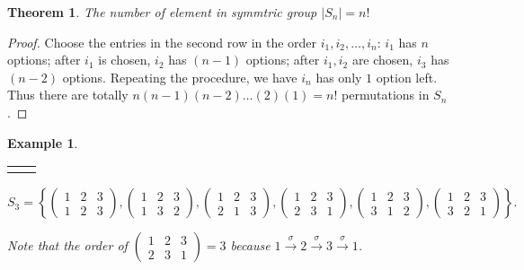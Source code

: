 \documentclass{article}
\theoremstyle{MyNonumberplain}
\theoremstyle{break}
\newtheorem*{proof}{Proof. }
\newcommand{\nline}{\begin{tabular}{ll}&\\\end{tabular}}
\theoremstyle{break}
\newtheorem{theorem}{Theorem}[section]
\newtheorem{example}{Example}[section]
\theoremstyle{break}
\theoremstyle{definition}
\theoremstyle{break}
\begin{document}
\begin{thmbox}
    \begin{theorem}
        The number of element in symmtric group $| S_n | = n!$
    \end{theorem}
    \begin{prfbox}
        \begin{proof}
            Choose the entries in the second row in the order $i_1, i_2, \ldots, i_n$:
            $i_1$ has $n$ options; after $i_1$ is chosen, $i_2$ has $(n - 1)$ options;
            after $i_1, i_2$ are chosen, $i_3$ has $(n - 2)$ options. Repeating the
            procedure, we have $i_n$ has only $1$ option left. Thus there are totally $n
            (n - 1) (n - 2) \ldots (2) (1) = n!$ permutations in $S_n$.
        \end{proof}
    \end{prfbox}
\end{thmbox}
\begin{expbox}
    \begin{example}

        \nline


        $S_3 = \left\{ \left(\begin{array}{ccc}
            1 & 2 & 3\\
            1 & 2 & 3
          \end{array}\right), \left(\begin{array}{ccc}
            1 & 2 & 3\\
            1 & 3 & 2
          \end{array}\right), \left(\begin{array}{ccc}
            1 & 2 & 3\\
            2 & 1 & 3
          \end{array}\right), \left(\begin{array}{ccc}
            1 & 2 & 3\\
            2 & 3 & 1
          \end{array}\right), \left(\begin{array}{ccc}
            1 & 2 & 3\\
            3 & 1 & 2
          \end{array}\right), \left(\begin{array}{ccc}
            1 & 2 & 3\\
            3 & 2 & 1
          \end{array}\right) \right\} .$\bigskip

          Note that the order of $\left(\begin{array}{ccc}
            1 & 2 & 3\\
            2 & 3 & 1
          \end{array}\right) = 3$ because $1 \xrightarrow{\sigma} 2 \xrightarrow{\sigma}
          3 \xrightarrow{\sigma} 1$.
    \end{example}
\end{expbox}
\end{document}

